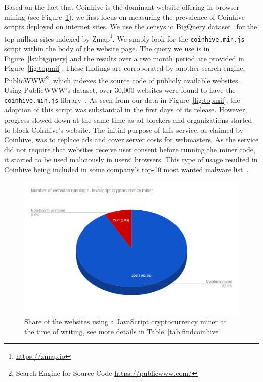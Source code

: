 Based on the fact that Coinhive is the dominant website offering in-browser mining  (see Figure~\ref{fig:coinhivevscopycats}), we first focus on measuring the prevalence of Coinhive scripts deployed on internet sites. We use the censys.io BigQuery dataset~\cite{censys15} for the top million sites indexed by Zmap\footnote{\url{https://zmap.io}}. We simply look for the \texttt{coinhive.min.js} script within the body of the website page. The query we use is in Figure~\ref{lst:bigquery} and the results over a two month period are provided in Figure~\ref{fig:topmil}. These findings are corroborated by another search engine, PublicWWW\footnote{Search Engine for Source Code \url{https://publicwww.com/}}, which indexes the source code of publicly available websites. Using PublicWWW's dataset, over 30,000 websites were found to have the \texttt{coinhive.min.js} library~\cite{badpacketspublicwww}. As seen from our data in Figure~\ref{fig:topmil}, the adoption of this script was substantial in the first days of its release. However, progress slowed down at the same time as ad-blockers and organizations started to block Coinhive's website. The initial purpose of this service, as claimed by Coinhive, was to replace ads and cover server costs for webmasters. As the service did not require that websites receive user consent before running the miner code, it started to be used maliciously in users` browsers. This type of usage resulted in Coinhive being included in some company's top-10 most wanted malware list~\cite{checkpoint}.


\begin{figure}[t]
\centering
\includegraphics[width=0.9\linewidth]{figures/coinhive-miners-pie.png}
\caption[Coinhive Market Share]{Share of the websites using a JavaScript cryptocurrency miner at the time of writing, see more details in Table~\ref{tab:findcoinhive}  \label{fig:coinhivevscopycats}}
\end{figure}

